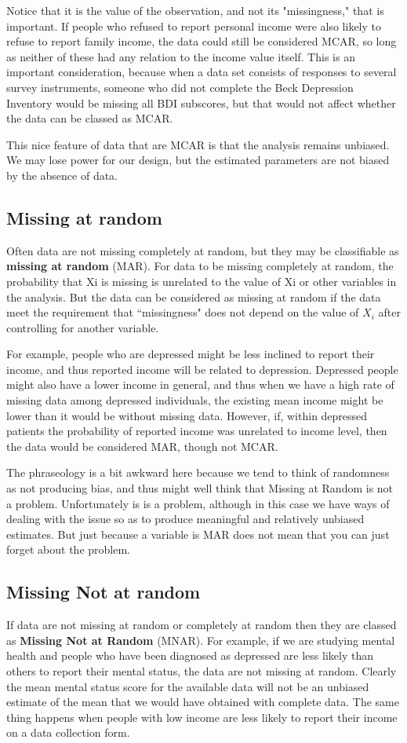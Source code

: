 \documentclass[]{article}
\begin{document}
Notice that it is the value of the observation, and not its "missingness," that is important. If people who refused to report personal income were also likely to refuse to report family income, the data could still be considered MCAR, so long as neither of these had any relation to the income value itself. This is an important consideration, because when a data set consists of responses to several survey instruments, someone who did not complete the Beck Depression Inventory would be missing all BDI subscores, but that would not affect whether the data can be classed as MCAR.

This nice feature of data that are MCAR is that the analysis remains unbiased. We may lose power for our design, but the estimated parameters are not biased by the absence of data.

\subsection{Missing at random}
Often data are not missing completely at random, but they may be classifiable as \textbf{missing at random} (MAR). For data to be missing completely at random, the probability that Xi is missing is unrelated to the value of Xi or other variables in the analysis. But the data can be considered as missing at random if the data meet the requirement that ``missingness" does not depend on the value of $X_i$ after controlling for another variable.

For example, people who are depressed might be less inclined to report their income, and thus reported income will be related to depression. Depressed people might also have a lower income in general, and thus when we have a high rate of missing data among depressed individuals, the existing mean income might be lower than it would be without missing data. However, if, within depressed patients the probability of reported income was unrelated to income level, then the data would be considered MAR, though not MCAR.

The phraseology is a bit awkward here because we tend to think of randomness as not producing bias, and thus might well think that Missing at Random is not a problem. Unfortunately is is a problem, although in this case we have ways of dealing with the issue so as to produce meaningful and relatively unbiased estimates. But just because a variable is MAR does not mean that you can just forget about the problem.

\subsection{Missing Not at random}
If data are not missing at random or completely at random then they are classed as \textbf{Missing Not at Random} (MNAR). For example, if we are studying mental health and people who have been diagnosed as depressed are less likely than others to report their mental status, the data are not missing at random. Clearly the mean mental status score for the available data will not be an unbiased estimate of the mean that we would have obtained with complete data. The same thing happens when people with low income are less likely to report their income on a data collection form.
\end{document}
